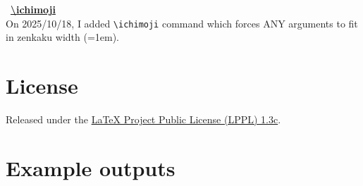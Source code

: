 \documentclass[luatex,fontsize=10pt,paper=b5,twoside]{jlreq}%
\begin{document}
\begin{quotation}

\end{quotation}

\noindent\triangleright \ \underline{\bfseries \textbackslash ichimoji}\\
On 2025/10/18, I added \verb|\ichimoji| command which forces ANY arguments to fit in zenkaku width (=1em).

\begin{quotation}
\end{quotation}


\section{License}

Released under the \href{https://www.latex-project.org/lppl/}{LaTeX Project Public License (LPPL) 1.3c}.

\clearpage\section{Example outputs}
\end{document}
